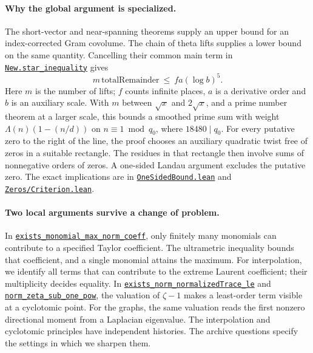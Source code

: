 \documentclass[11pt,letterpaper]{article}
\theoremstyle{definition}\newtheorem{example}[theorem]{Example}
\newcommand{\src}[2]{\href{https://github.com/lsernau/grh-lean/blob/72fead102f663d5c7a407964a13dc0cf9d977207/grh/src/#1}{#2}}
\numberwithin{equation}{section}
\begin{document}
\paragraph{Why the global argument is specialized.}
The short-vector and near-spanning theorems supply an upper bound for an index-corrected Gram covolume. The chain of theta lifts supplies a lower bound on the same quantity. Cancelling their common main term in
\src{New/Reduction/MainInequality.lean\#L87}{\texttt{New.star\_inequality}} gives
\[
       m\,\mathrm{totalRemainder}\ \le\ f a(\log b)^5.
\]
Here $m$ is the number of lifts; $f$ counts infinite places, $a$ is a derivative order and $b$ is an auxiliary scale. With $m$ between $\sqrt{x}$ and $2\sqrt{x}$, and a prime number theorem at a larger scale, this bounds a smoothed prime sum with weight $\Lambda(n)(1-(n/d))$ on $n\equiv1\bmod q_0$, where $18480\mid q_0$. For every putative zero to the right of the line, the proof chooses an auxiliary quadratic twist free of zeros in a suitable rectangle. The residues in that rectangle then involve sums of nonnegative orders of zeros. A one-sided Landau argument excludes the putative zero. The exact implications are in \src{New/Reduction/OneSidedBound.lean}{\texttt{OneSidedBound.lean}} and \src{New/Reduction/Zeros/Criterion.lean\#L37}{\texttt{Zeros/Criterion.lean}}.

\paragraph{Two local arguments survive a change of problem.}
In \src{New/Derivatives/Sharpness/OneCurve.lean\#L45}{\texttt{exists\_monomial\_max\_norm\_coeff}}, only finitely many monomials can contribute to a specified Taylor coefficient. The ultrametric inequality bounds that coefficient, and a single monomial attains the maximum. For interpolation, we identify all terms that can contribute to the extreme Laurent coefficient; their multiplicity decides equality. In \src{Lib/PadicHodge/TateSen.lean\#L108}{\texttt{exists\_norm\_normalizedTrace\_le}} and \src{Lib/PadicHodge/PeriodRings/AxTheorem.lean\#L347}{\texttt{norm\_zeta\_sub\_one\_pow}}, the valuation of $\zeta-1$ makes a least-order term visible at a cyclotomic point. For the graphs, the same valuation reads the first nonzero directional moment from a Laplacian eigenvalue. The interpolation and cyclotomic principles have independent histories. The archive questions \cite{oldbranches,oldgraphs} specify the settings in which we sharpen them.




\end{document}
